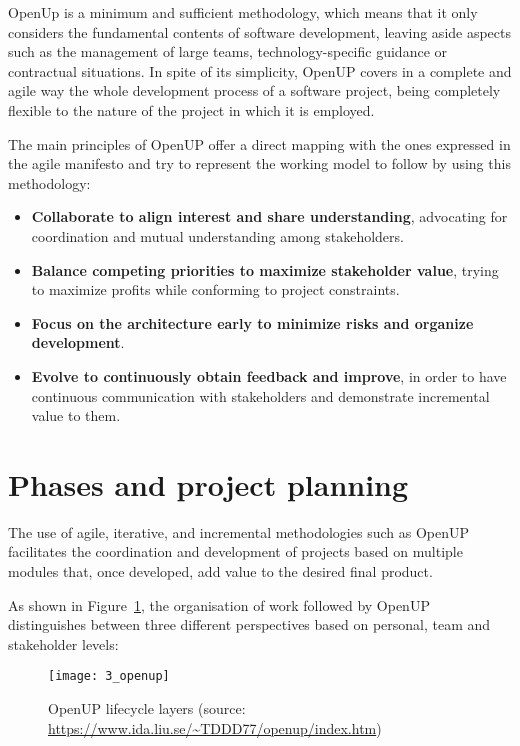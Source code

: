OpenUp is a minimum and sufficient methodology, which means that it only considers the fundamental contents of software development, leaving aside aspects such as the management of large teams, technology-specific guidance or contractual situations. In spite of its simplicity, OpenUP covers in a complete and agile way the whole development process of a software project, being completely flexible to the nature of the project in which it is employed.

The main principles of OpenUP offer a direct mapping with the ones expressed in the agile manifesto and try to represent the working model to follow by using this methodology:

\begin{itemize}
\item \textbf{Collaborate to align interest and share understanding}, advocating for coordination and mutual understanding among stakeholders.

\item \textbf{Balance competing priorities to maximize stakeholder value}, trying to maximize profits while conforming to project constraints.

\item \textbf{Focus on the architecture early to minimize risks and organize development}.

\item \textbf{Evolve to continuously obtain feedback and improve}, in order to have continuous communication with stakeholders and demonstrate incremental value to them.

\end{itemize}

\section{Phases and project planning}
\label{sec:phasesAndPlanning}

The use of agile, iterative, and incremental methodologies such as OpenUP facilitates the coordination and development of projects based on multiple modules that, once developed, add value to the desired final product.

As shown in Figure~\ref{fig:openUP}, the organisation of work followed by OpenUP distinguishes between three different perspectives based on personal, team and stakeholder levels:

\begin{figure}[htb]
	\centering
	\texttt{[image: 3\_openup]}
	\caption[OpenUP lifecycle]{OpenUP lifecycle layers (source: \url{https://www.ida.liu.se/~TDDD77/openup/index.htm})}
	\label{fig:openUP}
\end{figure}

